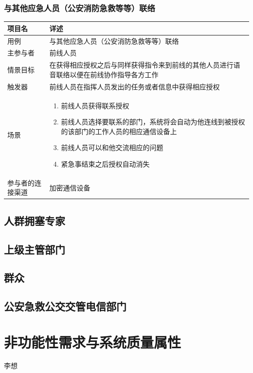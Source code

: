 \documentclass{ctexrep}
\begin{document}
\subsubsection{与其他应急人员（公安消防急救等等）联络}
\begin{longtable}{p{2cm} | p{10cm}}
\hline
项目名 & 详述 \\
\hline
\hline
用例 & 与其他应急人员（公安消防急救等等）联络\\
\hline
主参与者 & 前线人员 \\
\hline
情景目标 &  在获得相应授权之后与同样获得指令来到前线的其他人员进行语音联络以便在前线协作指导各方工作\\
\hline
触发器 & 前线人员在指挥人员发出的任务或者信息中获得相应授权 \\
\hline
场景 & \begin{enumerate}
	\item 前线人员获得联系授权
	\item 前线人员选择要联系的部门，系统将会自动为他连线到被授权的该部门的工作人员的相应通信设备上
	\item 前线人员可以和他交流相应的问题
	\item 紧急事结束之后授权自动消失
\end{enumerate} \\
\hline
参与者的连接渠道 & 加密通信设备\\
\hline
\end{longtable}

\subsection{人群拥塞专家}
\subsection{上级主管部门}
\subsection{群众}
\subsection{公安急救公交交管电信部门}








\section{非功能性需求与系统质量属性}
李想
\end{document}
